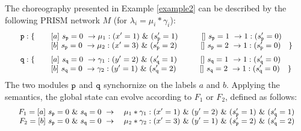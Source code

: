 \begin{example}\label{example3}
  The choreography presented in Example \ref{example2} can be
  described by the following PRISM network $M$ (for
  $\lambda_i=\mu_i*\gamma_i$):
\begin{displaymath}\small
  \begin{array}{llll}
    \mathtt{p}: \{ & \quad [a]\ s_{\mathtt{p}}=0\ \rightarrow \mu_1:(x'=1)
                   \ \&\ (s_{\mathtt{p}}'=1) 
                   \quad\qquad []\ s_{\mathtt{p}}=1\ \rightarrow 1:(s_{\mathtt{p}}'=0)\\
                 & \quad [b]\ s_{\mathtt{p}}=0\ \rightarrow \mu_2:(x'=3)
                   \ \&\ (s_{\mathtt{p}}'=2)
                   \quad\qquad []\ s_{\mathtt{p}}=2\ \rightarrow 1:(s_{\mathtt{p}}'=0)\quad \}\\[2mm]
    \mathtt{q}: \{ & \quad [a]\ s_{\mathtt{q}}=0\ \rightarrow \gamma_1:(y'=2)
                   \ \&\ (s_{\mathtt{q}}'=1) 
                   \qquad\quad []\ s_{\mathtt{q}}=1\ \rightarrow 1:(s_{\mathtt{q}}'=0)\\
                 & \quad [b]\ s_{\mathtt{q}}=0\ \rightarrow \gamma_2:(y'=1)
                   \ \&\ (s_{\mathtt{q}}'=2) 
                   \qquad\quad []\ s_{\mathtt{q}}=2\ \rightarrow 1:(s_{\mathtt{q}}'=0)\quad \}\\
  \end{array}
\end{displaymath}
The two modules $\mathtt{p}$ and $\mathtt{q}$ synchornize on the labels $a$
and $b$.  Applying the semantics, the global state can evolve
according to $F_1$ or $F_2$, defined as follows:
\begin{displaymath}\small
  \begin{array}{rlll}
    F_1=\commandBase {a}{s_{\role p}=0\ \&\ s_{\role q}=0} {\quad} \mu_1*\gamma_1 : 
    (x'=1) \ \&\ (y'=2) \ \&\ (s_{\role p}'=1) \ \&\ (s_{\role q}'=1) \\
    F_2=\commandBase {b}{s_{\role p}=0\ \&\ s_{\role q}=0} {\quad} \mu_2*\gamma_2 : 
    (x'=3) \ \&\ (y'=1) \ \&\  (s_{\role p}'=2) \ \&\ (s_{\role q}'=2)\\

  \end{array}
\end{displaymath} 

\end{example}

